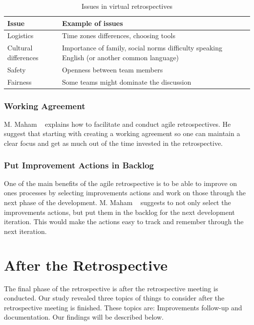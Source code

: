 \documentclass[12pt]{article}
\begin{document}
\begin{table}[!h]
	\centering
	\captionsetup{justification=centering}
	\caption{Issues in virtual retrospectives}
	\label{table:issues_virtual}
	\begin{tabular}{| l | p{}|}
	\hline
	Issue & Example of issues \\ \hline
	Logistics & Time zones differences, choosing tools \\
	Cultural differences & Importance of family, social norms difficulty speaking English (or another common language) \\
	Safety & Openness between team members \\
	Fairness & Some teams might dominate the discussion \\
	\hline
	\end{tabular}
\end{table}	





\subsubsection{Working Agreement}
M. Maham ~\cite{Maham2008} explains how to facilitate and conduct agile retrospectives. He suggest that starting with creating a working agreement so one can maintain a clear focus and get as much out of the time invested in the retrospective. 

\subsubsection{Put Improvement Actions in Backlog}
One of the main benefits of the agile retrospective is to be able to improve on ones processes by selecting improvements actions and work on those through the next phase of the development. M. Maham ~\cite{Maham2008} suggests to not only select the improvements actions, but put them in the backlog for the next development iteration. This would make the actions easy to track and remember through the next iteration. 

\section{After the Retrospective}
The final phase of the retrospective is after the retrospective meeting is conducted. Our study revealed three topics of things to consider after the retrospective meeting is finished. These topics are: Improvements follow-up and documentation. Our findings will be described below.
\end{document}

